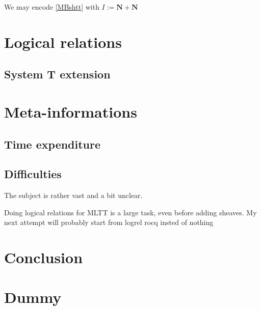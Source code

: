 \documentclass{article}
\newcommand{\0}{\mathbf{0}}
\newcommand{\1}{\mathbf{1}}
\newcommand{\nat}{\mathbf{N}}
\begin{document}
We may encode \ref{MBshtt} with $I := \nat + \nat$

\section{Logical relations}


\subsection{System T extension}

\section{Meta-informations}

\subsection{Time expenditure}


\subsection{Difficulties}

The subject is rather vast and a bit unclear.

Doing logical relations for MLTT is a large task, even before adding sheaves. My next attempt will probably start from logrel rocq insted of nothing


\section{Conclusion}



\newpage

\appendix
\appendixname

\section{Dummy}

\printbibliography
\end{document}
